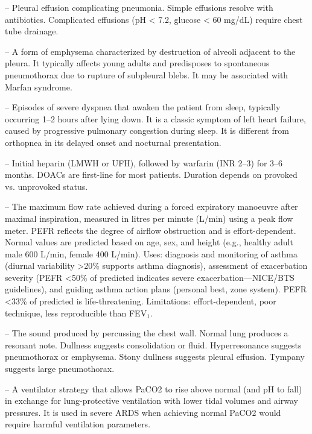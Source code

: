 -- Pleural effusion complicating pneumonia. Simple effusions resolve with antibiotics. Complicated effusions (pH < 7.2, glucose < 60 mg/dL) require chest tube drainage.

-- A form of emphysema characterized by destruction of alveoli adjacent to the pleura. It typically affects young adults and predisposes to spontaneous pneumothorax due to rupture of subpleural blebs. It may be associated with Marfan syndrome.

-- Episodes of severe dyspnea that awaken the patient from sleep, typically occurring 1--2 hours after lying down. It is a classic symptom of left heart failure, caused by progressive pulmonary congestion during sleep. It is different from orthopnea in its delayed onset and nocturnal presentation.

-- Initial heparin (LMWH or UFH), followed by warfarin (INR 2--3) for 3--6 months. DOACs are first-line for most patients. Duration depends on provoked vs. unprovoked status.

-- The maximum flow rate achieved during a forced expiratory manoeuvre after maximal inspiration, measured in litres per minute (L/min) using a peak flow meter. PEFR reflects the degree of airflow obstruction and is effort-dependent. Normal values are predicted based on age, sex, and height (e.g., healthy adult male 600 L/min, female 400 L/min). Uses: diagnosis and monitoring of asthma (diurnal variability >20\% supports asthma diagnosis), assessment of exacerbation severity (PEFR <50\% of predicted indicates severe exacerbation—NICE/BTS guidelines), and guiding asthma action plans (personal best, zone system). PEFR <33\% of predicted is life-threatening. Limitations: effort-dependent, poor technique, less reproducible than FEV$_1$.

-- The sound produced by percussing the chest wall. Normal lung produces a resonant note. Dullness suggests consolidation or fluid. Hyperresonance suggests pneumothorax or emphysema. Stony dullness suggests pleural effusion. Tympany suggests large pneumothorax.

-- A ventilator strategy that allows PaCO2 to rise above normal (and pH to fall) in exchange for lung-protective ventilation with lower tidal volumes and airway pressures. It is used in severe ARDS when achieving normal PaCO2 would require harmful ventilation parameters.

